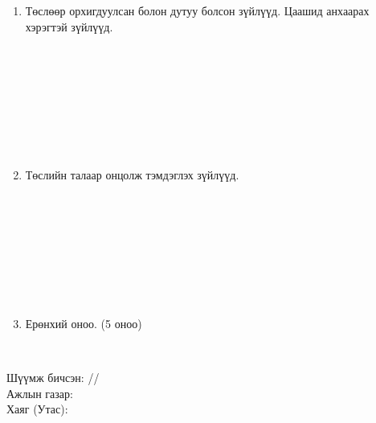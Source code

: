 \begin{titlepage}
\begin{enumerate}
    \item Төслөөр орхигдуулсан болон дутуу болсон зүйлүүд. Цаашид анхаарах хэрэгтэй зүйлүүд.
    \begin{center}
    \dotfill \\[0.1cm] \dotfill \\[0.1cm] \dotfill \\[0.1cm]
    \dotfill \\[0.1cm] \dotfill \\[0.1cm] \dotfill \\[0.1cm]
    \dotfill \\[0.4cm]
    \end{center}
    
    \item Төслийн талаар онцолж тэмдэглэх зүйлүүд.
    \begin{center}
    \dotfill \\[0.1cm] \dotfill \\[0.1cm] \dotfill \\[0.1cm]
    \dotfill \\[0.1cm] \dotfill \\[0.1cm] \dotfill \\[0.1cm]
    \dotfill \\[0.4cm]
    \end{center}
    
    \item Ерөнхий оноо. (5 оноо)
    \begin{center}
    \dotfill \\[0.8cm]
    \end{center}
    
    \end{enumerate}
    
    \noindent Шүүмж бичсэн: \makebox[4cm]{\dotfill} /\hspace{3cm}/ \\[0.5cm]
    \noindent Ажлын газар: \dotfill \\[0.5cm]
    \noindent Хаяг (Утас): \makebox[5cm]{\dotfill}
    
    \end{titlepage}